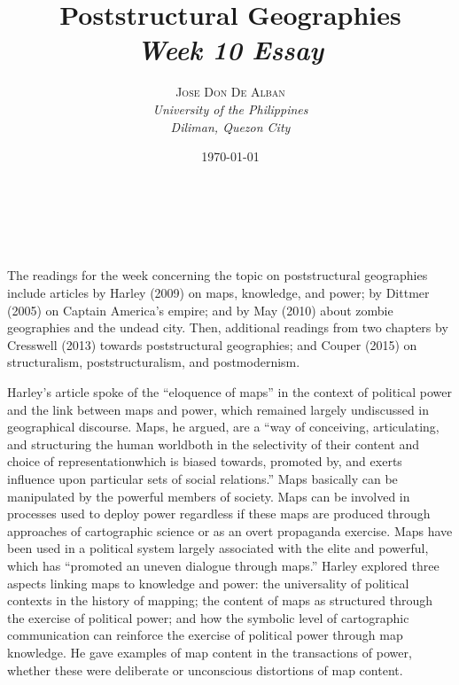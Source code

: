 \documentclass[a4paper, 10.5pt]{article} %
\title{\textbf{Poststructural Geographies}\\ %
\textsl{Week 10 Essay}} %
\author{\textsc{Jose Don De Alban} %
\\{\textit{University of the Philippines} %
\\{\textit{Diliman, Quezon City}}}} %
\date{\today} %
\makeatletter
\renewcommand{\maketitle}
{
\begin{flushright} %
{\LARGE\@title} %
\vspace{40pt} %

{\large\@author} %
\\\@date %

\vspace{10pt} %
\end{flushright}
}
\makeatother
\begin{document}
\maketitle %


\section*{}

The readings for the week concerning the topic on poststructural geographies include articles by Harley (2009) \cite{harley_2009} on maps, knowledge, and power; by Dittmer (2005) \cite{dittmer_2005} on Captain America's empire; and by May (2010) \cite{may_2010} about zombie geographies and the undead city. Then, additional readings from two chapters by Cresswell (2013) \cite{cresswell_2013} towards poststructural geographies; and Couper (2015) \cite{couper_2015} on structuralism, poststructuralism, and postmodernism.

Harley's article spoke of the \enquote{eloquence of maps} in the context of political power and the link between maps and power, which remained largely undiscussed in geographical discourse. Maps, he argued, are a \enquote{way of conceiving, articulating, and structuring the human world\textemdash{}both in the selectivity of their content and choice of representation\textemdash{}which is biased towards, promoted by, and exerts influence upon particular sets of social relations.} Maps basically can be manipulated by the powerful members of society. Maps can be involved in processes used to deploy power regardless if these maps are produced through approaches of cartographic science or as an overt propaganda exercise. Maps have been used in a political system largely associated with the elite and powerful, which has \enquote{promoted an uneven dialogue through maps.} Harley explored three aspects linking maps to knowledge and power: the universality of political contexts in the history of mapping; the content of maps as structured through the exercise of political power; and how the symbolic level of cartographic communication can reinforce the exercise of political power through map knowledge. He gave examples of map content in the transactions of power, whether these were deliberate or unconscious distortions of map content.
\end{document}
